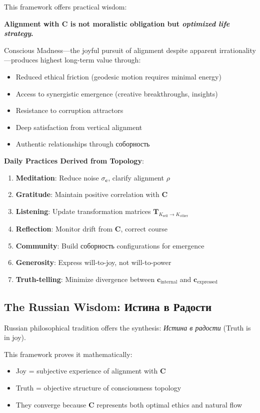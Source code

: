 \documentclass[11pt,a4paper]{article}
\theoremstyle{definition}
\theoremstyle{remark}
\newcommand{\cc}{\mathbf{c}}
\newcommand{\TT}{\mathbf{T}}
\begin{document}
This framework offers practical wisdom:

\begin{mdframed}[backgroundcolor=yellow!10]
\textbf{Alignment with \(\mathbf{C}\) is not moralistic obligation but \textit{optimized life strategy}.}

Conscious Madness—the joyful pursuit of alignment despite apparent irrationality—produces highest long-term value through:
\begin{itemize}
\item Reduced ethical friction (geodesic motion requires minimal energy)
\item Access to synergistic emergence (creative breakthroughs, insights)
\item Resistance to corruption attractors
\item Deep satisfaction from vertical alignment
\item Authentic relationships through соборность
\end{itemize}

\textbf{Daily Practices Derived from Topology}:
\begin{enumerate}
\item \textbf{Meditation}: Reduce noise \(\sigma_{\cc}\), clarify alignment \(\rho\)
\item \textbf{Gratitude}: Maintain positive correlation with \(\mathbf{C}\)
\item \textbf{Listening}: Update transformation matrices \(\TT_{K_{\text{self}} \to K_{\text{other}}}\)
\item \textbf{Reflection}: Monitor drift from \(\mathbf{C}\), correct course
\item \textbf{Community}: Build соборность configurations for emergence
\item \textbf{Generosity}: Express will-to-joy, not will-to-power
\item \textbf{Truth-telling}: Minimize divergence between \(\cc_{\text{internal}}\) and \(\cc_{\text{expressed}}\)
\end{enumerate}
\end{mdframed}

\subsection{The Russian Wisdom: Истина в Радости}

Russian philosophical tradition offers the synthesis: \textit{Истина в радости} (Truth is in joy).

This framework proves it mathematically:
\begin{itemize}
\item Joy = subjective experience of alignment with \(\mathbf{C}\)
\item Truth = objective structure of consciousness topology
\item They converge because \(\mathbf{C}\) represents both optimal ethics and natural flow
\end{itemize}
\end{document}
